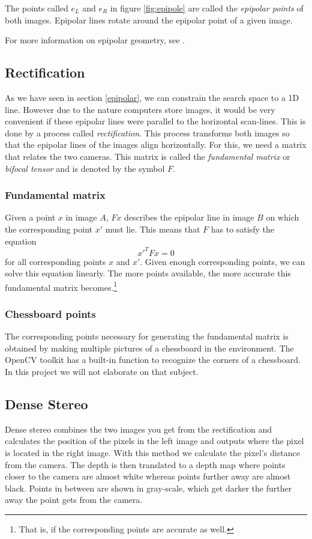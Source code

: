 \documentclass[a4paper]{article}
\begin{document}
The points called $e_{L}$ and $e_{R}$ in figure \ref{fig:epipole} are
called the \emph{epipolar points} of both images. Epipolar lines
rotate around the epipolar point of a given image.

For more information on epipolar geometry, see \cite{Hartley2004}.

\subsection{Rectification}
\label{rectification} As we have seen in section \ref{epipolar}, we
can constrain the search space to a 1D line. However due to the nature
computers store images, it would be very convenient if these epipolar
lines were parallel to the horizontal scan-lines.  This is done by a
process called \emph{rectification}. This process transforms both
images so that the epipolar lines of the images align
horizontally. For this, we need a matrix that relates the two
cameras. This matrix is called the \emph{fundamental matrix} or
\emph{bifocal tensor} and is denoted by the symbol $F$.

\subsubsection{Fundamental matrix} Given a point $x$ in image $A$,
$Fx$ describes the epipolar line in image $B$ on which the
corresponding point $x'$ must lie. This means that $F$ has to satisfy
the equation
\[ x'^{T}Fx = 0 \] for all corresponding points $x$ and $x'$. Given
enough corresponding points, we can solve this equation linearly. The
more points available, the more accurate this fundamental matrix
becomes.\footnote{That is, if the corresponding points are accurate as
well.}

\subsubsection{Chessboard points} The corresponding points necessary
for generating the fundamental matrix is obtained by making multiple
pictures of a chessboard in the environment. The OpenCV toolkit has a
built-in function to recognize the corners of a chessboard.  In this
project we will not elaborate on that subject.

\subsection{Dense Stereo} 
Dense stereo combines the two images you get from the rectification
and calculates the position of the pixels in the left image and
outputs where the pixel is located in the right image. With this
method we calculate the pixel's distance from the camera.  The depth
is then translated to a depth map where points closer to the camera
are almost white whereas points further away are almost black. Points
in between are shown in gray-scale, which get darker the further away
the point gets from the camera.
\end{document}
